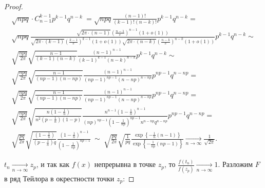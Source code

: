 \begin{proof}
\begin{gather*}
\sqrt{npq} \cdotp C_{n-1}^{k-1} p^{k-1} q^{n-k} \ =\sqrt{npq}\frac{( n-1) !}{( k-1) !( n-k) !} p^{k-1} q^{n-k} =\\ \sqrt{npq}\frac{\sqrt{2\pi \cdotp ( n-1)}\left(\frac{n-1}{e}\right)^{n-1}( 1+o( 1))}{\sqrt{2\pi \cdotp ( k-1)}\left(\frac{k-1}{e}\right)^{k-1}( 1+o( 1))\sqrt{2\pi \cdotp ( n-k)}\left(\frac{n-k}{e}\right)^{n-k}( 1+o( 1))} p^{k-1} q^{n-k}\sim\\ \sqrt{\frac{npq}{2\pi }}\sqrt{\frac{n-1}{( k-1)( n-k)}}\frac{( n-1)^{n-1}}{( k-1)^{k-1}( n-k)^{n-k}} p^{k-1} q^{n-k}\sim\\ \sqrt{\frac{npq}{2\pi }}\sqrt{\frac{n-1}{( np-1)( n-np)}}\frac{( n-1)^{n-1}}{( np-1)^{np-1}( n-np)^{n-np}} p^{np-1} q^{n-np} =\\ \sqrt{\frac{npq}{2\pi }}\sqrt{\frac{n-1}{( np-1)( n-np)}}\frac{( n-1)^{n-1}}{( np-1)^{np-1}( n-np)^{n-np}} p^{np-1} q^{n-np} =\\ \sqrt{\frac{npq}{2\pi }}\sqrt{\frac{n\left( 1-\frac{1}{n}\right)}{n^{2}\left( p-\frac{1}{n}\right)( 1-p)}}\frac{n^{n-1}\left( 1-\frac{1}{n}\right)^{n-1}}{( np)^{np-1}\left( 1-\frac{1}{np}\right)^{np-1} n^{n-np} q^{n-np}} p^{np-1} q^{n-np} =\\ \sqrt{\frac{pq}{2\pi }}\sqrt{\frac{\left( 1-\frac{1}{n}\right)}{\left( p-\frac{1}{n}\right) q}}\frac{\left( 1-\frac{1}{n}\right)^{n-1}}{\left( 1-\frac{1}{np}\right)^{np-1}} \ \sim \ \sqrt{\frac{pq}{2\pi }}\sqrt{\frac{1}{pq}}\frac{\exp\left\{-\frac{1}{n}( n-1)\right\}}{\exp\left\{-\frac{1}{np}( np-1)\right\}}\xrightarrow[n\rightarrow \infty ]{}\frac{1}{\sqrt{2\pi }} .
\end{gather*}


$\displaystyle t_{n}\xrightarrow[n\rightarrow \infty ]{} z_{p}$, и так как $\displaystyle f( x)$ непрерывна в точке $\displaystyle z_{p}$, то $\displaystyle \frac{f( t_{n})}{f( z_{p})}\xrightarrow[n\rightarrow \infty ]{} 1$. Разложим $\displaystyle F$ в ряд Тейлора в окрестности точки $\displaystyle z_{p}$:



\end{proof}
